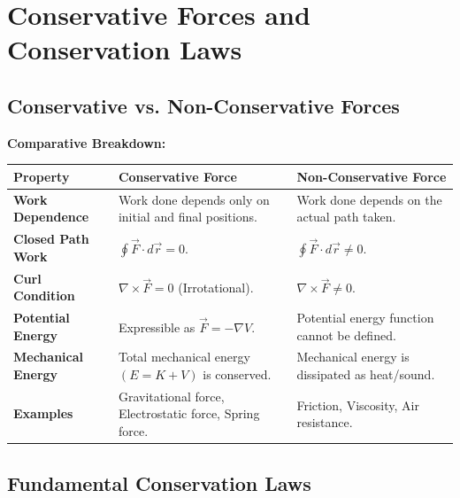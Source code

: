 \documentclass[12pt,a4paper]{article}
\begin{document}
\section{Conservative Forces and Conservation Laws}

\subsection{Conservative vs. Non-Conservative Forces}

\textbf{Comparative Breakdown:}\par\vspace{6pt}\noindent
\begin{tabularx}{\linewidth}{|B{3.5cm}|Y|Y|}
\hline
\textbf{Property} & \textbf{Conservative Force} & \textbf{Non-Conservative Force} \\
\hline
\textbf{Work Dependence} & Work done depends only on initial and final positions. & Work done depends on the actual path taken. \\
\hline
\textbf{Closed Path Work} & $\oint \vec{F} \cdot d\vec{r} = 0$. & $\oint \vec{F} \cdot d\vec{r} \neq 0$. \\
\hline
\textbf{Curl Condition} & $\nabla \times \vec{F} = 0$ (Irrotational). & $\nabla \times \vec{F} \neq 0$. \\
\hline
\textbf{Potential Energy} & Expressible as $\vec{F} = -\nabla V$. & Potential energy function cannot be defined. \\
\hline
\textbf{Mechanical Energy} & Total mechanical energy $(E = K + V)$ is conserved. & Mechanical energy is dissipated as heat/sound. \\
\hline
\textbf{Examples} & Gravitational force, Electrostatic force, Spring force. & Friction, Viscosity, Air resistance. \\
\hline
\end{tabularx}

\subsection{Fundamental Conservation Laws}
\end{document}

